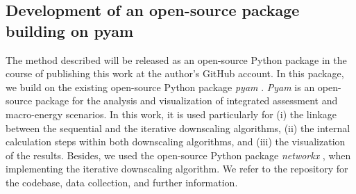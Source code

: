 \subsection{Development of an open-source package building on pyam}\label{open}
The method described will be released as an open-source Python package in the course of publishing this work at the author's GitHub account. In this package, we build on the existing open-source Python package \textit{pyam} \cite{huppmann2021pyam}. \textit{Pyam} is an open-source package for the analysis and visualization of integrated assessment and macro-energy scenarios. In this work, it is used particularly for (i) the linkage between the sequential and the iterative downscaling algorithms, (ii) the internal calculation steps within both downscaling algorithms, and (iii) the visualization of the results. Besides, we used the open-source Python package \textit{networkx} \cite{hagberg2008exploring}, when implementing the iterative downscaling algorithm. We refer to the repository for the codebase, data collection, and further information. 
